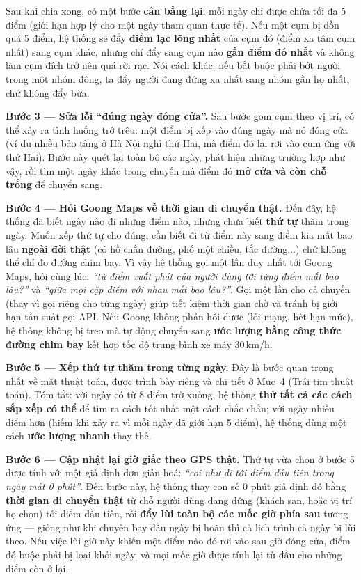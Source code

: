 \documentclass[12pt,a4paper]{article}
\begin{document}
Sau khi chia xong, có một bước \textbf{cân bằng lại}: mỗi ngày chỉ được chứa
tối đa 5 điểm (giới hạn hợp lý cho một ngày tham quan thực tế). Nếu một cụm bị
dồn quá 5 điểm, hệ thống sẽ đẩy \textbf{điểm lạc lõng nhất} của cụm đó (điểm xa
tâm cụm nhất) sang cụm khác, nhưng chỉ đẩy sang cụm nào \textbf{gần điểm đó
nhất} và không làm cụm đích trở nên quá rời rạc. Nói cách khác: nếu bắt buộc
phải bớt người trong một nhóm đông, ta đẩy người đang đứng xa nhất sang nhóm
gần họ nhất, chứ không đẩy bừa.

\textbf{Bước 3 --- Sửa lỗi ``đúng ngày đóng cửa''.} Sau bước gom cụm theo vị
trí, có thể xảy ra tình huống trớ trêu: một điểm bị xếp vào đúng ngày mà nó
đóng cửa (ví dụ nhiều bảo tàng ở Hà Nội nghỉ thứ Hai, mà điểm đó lại rơi vào
cụm ứng với thứ Hai). Bước này quét lại toàn bộ các ngày, phát hiện những
trường hợp như vậy, rồi tìm một ngày khác trong chuyến mà điểm đó \textbf{mở
cửa và còn chỗ trống} để chuyển sang.

\textbf{Bước 4 --- Hỏi Goong Maps về thời gian di chuyển thật.} Đến đây, hệ
thống đã biết ngày nào đi những điểm nào, nhưng chưa biết \textbf{thứ tự} thăm
trong ngày. Muốn xếp thứ tự cho đúng, cần biết đi từ điểm này sang điểm kia mất
bao lâu \textbf{ngoài đời thật} (có hồ chắn đường, phố một chiều, tắc đường...)
chứ không thể chỉ đo đường chim bay. Vì vậy hệ thống gọi một lần duy nhất tới
Goong Maps, hỏi cùng lúc: \textit{``từ điểm xuất phát của người dùng tới từng
điểm mất bao lâu?''} và \textit{``giữa mọi cặp điểm với nhau mất bao lâu?''}.
Gọi một lần cho cả chuyến (thay vì gọi riêng cho từng ngày) giúp tiết kiệm thời
gian chờ và tránh bị giới hạn tần suất gọi API. Nếu Goong không phản hồi được
(lỗi mạng, hết hạn mức), hệ thống không bị treo mà tự động chuyển sang
\textbf{ước lượng bằng công thức đường chim bay} kết hợp tốc độ trung bình xe
máy 30\,km/h.

\textbf{Bước 5 --- Xếp thứ tự thăm trong từng ngày.} Đây là bước quan trọng
nhất về mặt thuật toán, được trình bày riêng và chi tiết ở Mục~4 (Trái tim
thuật toán). Tóm tắt: với ngày có từ 8 điểm trở xuống, hệ thống \textbf{thử tất
cả các cách sắp xếp có thể} để tìm ra cách tốt nhất một cách chắc chắn; với
ngày nhiều điểm hơn (hiếm khi xảy ra vì mỗi ngày đã giới hạn 5 điểm), hệ thống
dùng một cách \textbf{ước lượng nhanh} thay thế.

\textbf{Bước 6 --- Cập nhật lại giờ giấc theo GPS thật.} Thứ tự vừa chọn ở bước
5 được tính với một giả định đơn giản hoá: \textit{``coi như đi tới điểm đầu
tiên trong ngày mất 0 phút''}. Đến bước này, hệ thống thay con số 0 phút giả
định đó bằng \textbf{thời gian di chuyển thật} từ chỗ người dùng đang đứng
(khách sạn, hoặc vị trí họ chọn) tới điểm đầu tiên, rồi \textbf{đẩy lùi toàn bộ
các mốc giờ phía sau} tương ứng --- giống như khi chuyến bay đầu ngày bị hoãn
thì cả lịch trình cả ngày bị lùi theo. Nếu việc lùi giờ này khiến một điểm nào
đó rơi vào sau giờ đóng cửa, điểm đó buộc phải bị loại khỏi ngày, và mọi mốc
giờ được tính lại từ đầu cho những điểm còn ở lại.
\end{document}
